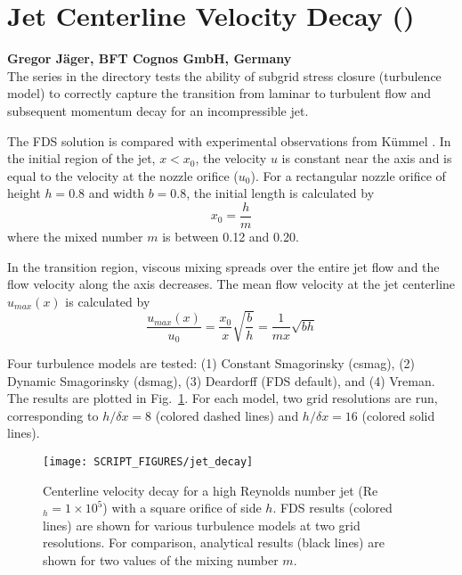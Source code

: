 \documentclass[11pt]{book}
\begin{document}
\section{Jet Centerline Velocity Decay (\texorpdfstring{}{jet})}

\textbf{Gregor J\"ager, BFT Cognos GmbH, Germany}\\

\noindent The  series in the  directory tests the ability of subgrid stress closure (turbulence model) to correctly capture the transition from laminar to turbulent flow and subsequent momentum decay for an incompressible jet.

The FDS solution is compared with experimental observations from K\"ummel \cite{Kummel:2007}. In the initial region of the jet, $x<x_0$, the velocity $u$ is constant near the axis and is equal to the velocity at the nozzle orifice ($u_0$). For a rectangular nozzle orifice of height $h = 0.8$ and width $b = 0.8$, the initial length is calculated by
\begin{equation}
x_0 = \frac{h}{m}
\end{equation}
where the mixed number $m$ is between 0.12 and 0.20.

In the transition region, viscous mixing spreads over the entire jet flow and the flow velocity along the axis decreases. The mean flow velocity at the jet centerline $u_{max}(x)$ is calculated by
\begin{equation}
\frac{u_{max}(x)}{u_0} = \frac{x_0}{x}\sqrt{\frac{b}{h}} = \frac{1}{mx} \sqrt{bh}
\end{equation}

Four turbulence models are tested: (1) Constant Smagorinsky (csmag), (2) Dynamic Smagorinsky (dsmag), (3) Deardorff (FDS default), and (4) Vreman.  The results are plotted in Fig.~\ref{fig_jet_decay}. For each model, two grid resolutions are run, corresponding to $h/\delta x = 8$ (colored dashed lines) and $h/\delta x=16$ (colored solid lines).
\begin{figure}[h]
\centering
\texttt{[image: SCRIPT\_FIGURES/jet\_decay]}
\caption[Jet centerline velocity decay]{Centerline velocity decay for a high Reynolds number jet (Re$_h = 1 \times 10^5$) with a square orifice of side $h$.  FDS results (colored lines) are shown for various turbulence models at two grid resolutions.  For comparison, analytical results (black lines) are shown for two values of the mixing number $m$.}
\label{fig_jet_decay}
\end{figure}
\end{document}
